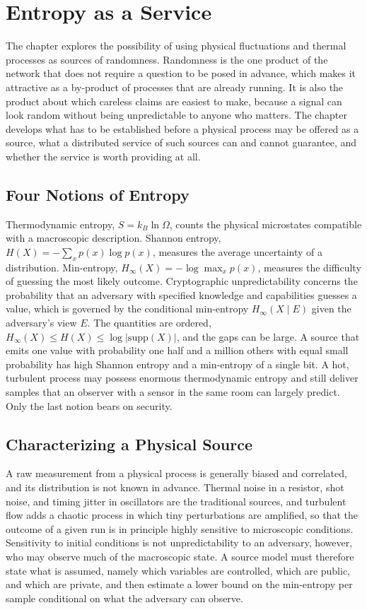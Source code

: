 \chapter{Entropy as a Service}
\label{ch:entropy}

The chapter explores the possibility of using physical fluctuations and thermal processes as sources of randomness. Randomness is the one product of the network that does not require a question to be posed in advance, which makes it attractive as a by-product of processes that are already running. It is also the product about which careless claims are easiest to make, because a signal can look random without being unpredictable to anyone who matters. The chapter develops what has to be established before a physical process may be offered as a source, what a distributed service of such sources can and cannot guarantee, and whether the service is worth providing at all.

\section{Four Notions of Entropy}

Thermodynamic entropy, $S=k_B\ln\Omega$, counts the physical microstates compatible with a macroscopic description. Shannon entropy, $H(X)=-\sum_x p(x)\log p(x)$, measures the average uncertainty of a distribution. Min-entropy, $H_\infty(X)=-\log\max_x p(x)$, measures the difficulty of guessing the most likely outcome. Cryptographic unpredictability concerns the probability that an adversary with specified knowledge and capabilities guesses a value, which is governed by the conditional min-entropy $H_\infty(X\mid E)$ given the adversary's view $E$. The quantities are ordered, $H_\infty(X)\le H(X)\le\log|\mathrm{supp}(X)|$, and the gaps can be large. A source that emits one value with probability one half and a million others with equal small probability has high Shannon entropy and a min-entropy of a single bit. A hot, turbulent process may possess enormous thermodynamic entropy and still deliver samples that an observer with a sensor in the same room can largely predict. Only the last notion bears on security.

\section{Characterizing a Physical Source}

A raw measurement from a physical process is generally biased and correlated, and its distribution is not known in advance. Thermal noise in a resistor, shot noise, and timing jitter in oscillators are the traditional sources, and turbulent flow adds a chaotic process in which tiny perturbations are amplified, so that the outcome of a given run is in principle highly sensitive to microscopic conditions. Sensitivity to initial conditions is not unpredictability to an adversary, however, who may observe much of the macroscopic state. A source model must therefore state what is assumed, namely which variables are controlled, which are public, and which are private, and then estimate a lower bound on the min-entropy per sample conditional on what the adversary can observe.

